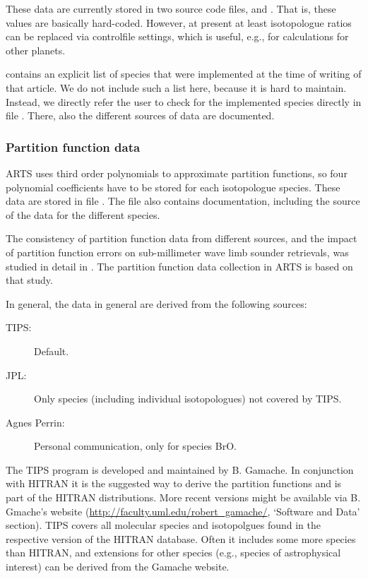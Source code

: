 These data are currently stored in two source code files,
 and . 
That is, these values are basically hard-coded.
However, at present at least isotopologue ratios can be replaced via controlfile
settings, which is useful, e.g., for calculations for other planets.

\citet{buehler:artst:05} contains an explicit list of species that
were implemented at the time of writing of that article.  We do not include
such a list here, because it is hard to maintain. Instead, we directly refer
the user to check for the implemented species directly in file
. There, also the different sources of data
are documented.

\subsubsection{Partition function data}

ARTS uses third order polynomials to approximate partition functions,
so four polynomial coefficients have to be stored for each isotopologue
species. These data are stored in file
. The file also contains
documentation, including the source of the data for the different species.

The consistency of partition function data from different sources, and
the impact of partition function errors on sub-millimeter wave limb
sounder retrievals, was studied in detail in \citet{cverdes:05}. The
partition function data collection in ARTS is based on that study.

In general, the data in general are derived from the following sources:
\begin{description}
\item[TIPS:] Default.
\item[JPL:] Only species (including individual isotopologues) not covered by TIPS.
\item[Agnes Perrin:] Personal communication, only for species BrO.
\end{description}

The TIPS program is developed and maintained by B. Gamache. In conjunction
with HITRAN it is the suggested way to derive the partition functions and is
part of the HITRAN distributions. More recent versions might be available via B.
Gmache's website (\url{http://faculty.uml.edu/robert_gamache/}, `Software and
Data' section). TIPS covers all molecular species and isotopolgues found in the
respective version of the HITRAN database. Often it includes some more species
than HITRAN, and extensions for other species (e.g., species of astrophysical
interest) can be derived from the Gamache website.

